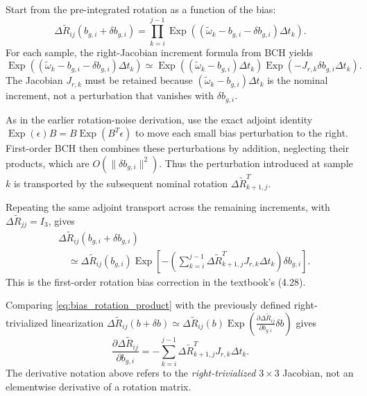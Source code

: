 \documentclass[11pt,a4paper]{article}
\newcommand{\Exp}{\operatorname{Exp}}
\begin{document}
Start from the pre-integrated rotation as a function of the bias:
\begin{equation}
\Delta\tilde R_{ij}(b_{g,i}+\delta b_{g,i})
=\prod_{k=i}^{j-1}\Exp\!\left(
(\tilde\omega_k-b_{g,i}-\delta b_{g,i})\Delta t_k\right).
\end{equation}
For each sample, the right-Jacobian increment formula
from BCH yields
\begin{equation}\label{eq:bias_one_step}
\Exp((\tilde\omega_k-b_{g,i}-\delta b_{g,i})\Delta t_k)
\simeq\Exp((\tilde\omega_k-b_{g,i})\Delta t_k)\Exp(-J_{r,k}\delta b_{g,i}\Delta t_k).
\end{equation}
The Jacobian $J_{r,k}$ must be retained because $(\tilde\omega_k-b_{g,i})\Delta t_k$ is the
nominal increment, not a perturbation that vanishes with $\delta b_{g,i}$.

As in the earlier rotation-noise derivation, use the exact adjoint
identity $\Exp(\epsilon)B=B\Exp(B^T\epsilon)$ to move each small
bias perturbation to the right. First-order BCH then combines these
perturbations by addition, neglecting their products, which are
$O(\|\delta b_{g,i}\|^2)$. Thus the perturbation introduced at sample
$k$ is transported by the subsequent nominal rotation
$\Delta\tilde R_{k+1,j}^{T}$.

Repeating the same adjoint transport across the remaining increments,
with $\Delta\tilde R_{jj}=I_3$, gives
\begin{equation}\label{eq:bias_rotation_product}
\boxed{\begin{aligned}
&\Delta\tilde R_{ij}(b_{g,i}+\delta b_{g,i})\\
&\quad\simeq \Delta\tilde R_{ij}(b_{g,i})
\Exp\!\left[-\left(\sum_{k=i}^{j-1}
\Delta\tilde R_{k+1,j}^{T}J_{r,k}\Delta t_k\right)
\delta b_{g,i}\right].
\end{aligned}}
\end{equation}
This is the first-order rotation bias correction in the textbook's (4.28).

Comparing \eqref{eq:bias_rotation_product} with the previously defined
right-trivialized linearization
$\Delta\tilde R_{ij}(b+\delta b)\simeq
\Delta\tilde R_{ij}(b)\Exp(\frac{\partial\Delta\tilde R_{ij}}{\partial b_{g,i}}\delta b)$ gives
\begin{equation}\label{eq:bias_rotation_jac_sum}
\boxed{\frac{\partial\Delta\tilde R_{ij}}{\partial b_{g,i}}
=-\sum_{k=i}^{j-1}\Delta\tilde R_{k+1,j}^{T}
J_{r,k}\Delta t_k.}
\end{equation}
The derivative notation above refers to the \emph{right-trivialized}
$3\times3$ Jacobian, not an elementwise derivative of a rotation matrix.
\end{document}
